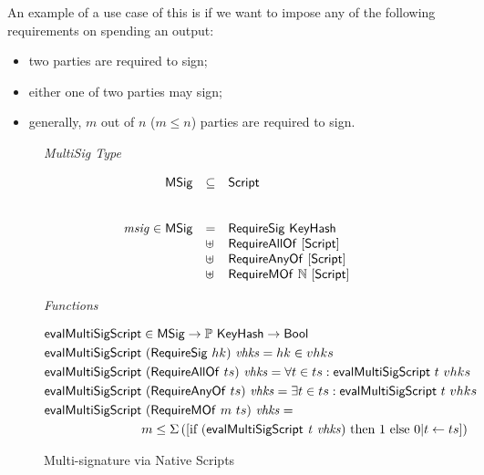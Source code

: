 An example of a use case of this is if we want to impose any of the following
requirements on spending an output:
\begin{itemize}
\item two parties are required to sign;
\item either one of two parties may sign;
\item generally, $m$ out of $n$ ($m \leq n$) parties are required to sign.
\end{itemize}

\begin{figure*}[hbt]
  \emph{MultiSig Type}

  \begin{equation*}
    \begin{array}{rll}
      \mathsf{MSig} & \subseteq & \mathsf{Script} \\
      \\~\\
      \mathit{msig}\in\mathsf{MSig} & = & \mathsf{RequireSig}~\mathsf{KeyHash}\\
      & \uplus &
         \mathsf{RequireAllOf}~[\mathsf{Script}] \\
      & \uplus&
         \mathsf{RequireAnyOf}~[\mathsf{Script}] \\
      & \uplus&
        \mathsf{RequireMOf}~\mathbb{N}~[\mathsf{Script}]
    \end{array}
  \end{equation*}

  \emph{Functions}

  \begin{align*}
    \mathsf{evalMultiSigScript} & \in\mathsf{MSig}\to\mathbb{P}~\mathsf{KeyHash}\to\mathsf{Bool} & \\
    \mathsf{evalMultiSigScript} & ~(\mathsf{RequireSig}~hk)~\mathit{vhks} =  hk \in vhks \\
    \mathsf{evalMultiSigScript} & ~(\mathsf{RequireAllOf}~ts)~\mathit{vhks} =
                              \forall t \in ts: \mathsf{evalMultiSigScript}~t~vhks\\
    \mathsf{evalMultiSigScript} & ~(\mathsf{RequireAnyOf}~ts)~\mathit{vhks} =
                              \exists t \in ts: \mathsf{evalMultiSigScript}~t~vhks\\
    \mathsf{evalMultiSigScript} & ~(\mathsf{RequireMOf}~m~ts)~\mathit{vhks} = \\
                             & m \leq \Sigma
                               \left(
                               [\textrm{if}~(\mathsf{evalMultiSigScript}~\mathit{t}~\mathit{vhks})~
                               \textrm{then}~1~\textrm{else}~0\vert t \leftarrow ts]
                               \right)
  \end{align*}

  \caption{Multi-signature via Native Scripts}
  \label{fig:types-msig}
\end{figure*}

\clearpage
